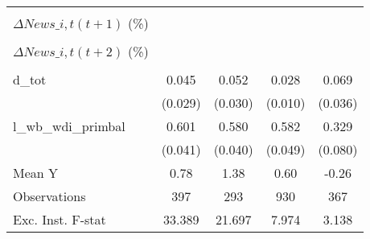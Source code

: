 {\begin{tabular}{l*{4}{c}}
                    &                     &                     &                     &                     \\
\addlinespace
$ \Delta News\_{i,t}(t+1)$ (\%)&                     &                     &                     &                     \\
                    &                     &                     &                     &                     \\
\addlinespace
$ \Delta News\_{i,t}(t+2)$ (\%)&                     &                     &                     &                     \\
                    &                     &                     &                     &                     \\
\addlinespace
d\_tot               &       0.045         &       0.052\sym{*}  &       0.028\sym{***}&       0.069\sym{*}  \\
                    &     (0.029)         &     (0.030)         &     (0.010)         &     (0.036)         \\
\addlinespace
l\_wb\_wdi\_primbal    &       0.601\sym{***}&       0.580\sym{***}&       0.582\sym{***}&       0.329\sym{***}\\
                    &     (0.041)         &     (0.040)         &     (0.049)         &     (0.080)         \\
\midrule
Mean Y              &        0.78         &        1.38         &        0.60         &       -0.26         \\
Observations        &         397         &         293         &         930         &         367         \\
Exc. Inst. F-stat   &      33.389         &      21.697         &       7.974         &       3.138         \\
\bottomrule
\end{tabular}
}
